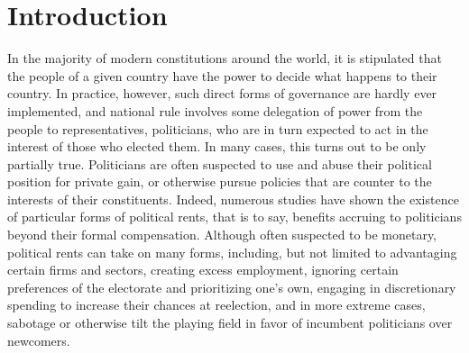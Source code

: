\documentclass[]{book}
\begin{document}
\hypertarget{introduction}{%
\section{Introduction}\label{introduction}}

In the majority of modern constitutions around the world, it is stipulated that the people of a given country have the power to decide what happens to their country. In practice, however, such direct forms of governance are hardly ever implemented, and national rule involves some delegation of power from the people to representatives, politicians, who are in turn expected to act in the interest of those who elected them. In many cases, this turns out to be only partially true. Politicians are often suspected to use and abuse their political position for private gain, or otherwise pursue policies that are counter to the interests of their constituents. Indeed, numerous studies have shown the existence of particular forms of political rents, that is to say, benefits accruing to politicians beyond their formal compensation. Although often suspected to be monetary, political rents can take on many forms, including, but not limited to advantaging certain firms and sectors, creating excess employment, ignoring certain preferences of the electorate and prioritizing one's own, engaging in discretionary spending to increase their chances at reelection, and in more extreme cases, sabotage or otherwise tilt the playing field in favor of incumbent politicians over newcomers.
\end{document}
